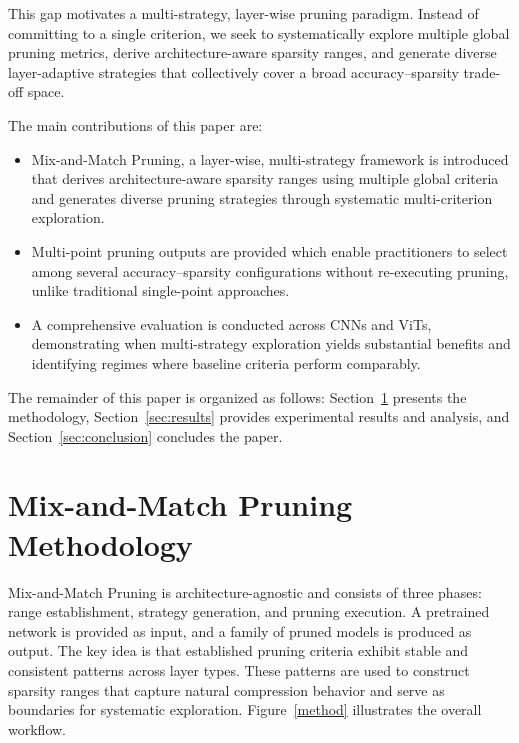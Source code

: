 \documentclass[11pt, conference]{IEEEtran}
\begin{document}
This gap motivates a multi-strategy, layer-wise pruning paradigm. Instead of committing to a single criterion, we seek to systematically explore multiple global pruning metrics, derive architecture-aware sparsity ranges, and generate diverse layer-adaptive strategies that collectively cover a broad accuracy--sparsity trade-off space.



The main contributions of this paper are:
\begin{itemize}
    \item Mix-and-Match Pruning, a layer-wise, multi-strategy framework is introduced that derives architecture-aware sparsity ranges using multiple global criteria and generates diverse pruning strategies through systematic multi-criterion exploration.
    \item Multi-point pruning outputs are provided which enable practitioners to select among several accuracy--sparsity configurations without re-executing pruning, unlike traditional single-point approaches.
    \item A comprehensive evaluation is conducted across CNNs and ViTs, demonstrating when multi-strategy exploration yields substantial benefits and identifying regimes where baseline criteria perform comparably.
\end{itemize}

The remainder of this paper is organized as follows: Section~\ref{sec:method} presents the methodology, Section~\ref{sec:results} provides experimental results and analysis, and Section~\ref{sec:conclusion} concludes the paper.



\section{Mix-and-Match Pruning Methodology}
\label{sec:method}
Mix-and-Match Pruning is architecture-agnostic and consists of three phases: range establishment, strategy generation, and pruning execution. A pretrained network is provided as input, and a family of pruned models is produced as output. The key idea is that established pruning criteria exhibit stable and consistent patterns across layer types. These patterns are used to construct sparsity ranges that capture natural compression behavior and serve as boundaries for systematic exploration. Figure~\ref{method} illustrates the overall workflow.
\end{document}
